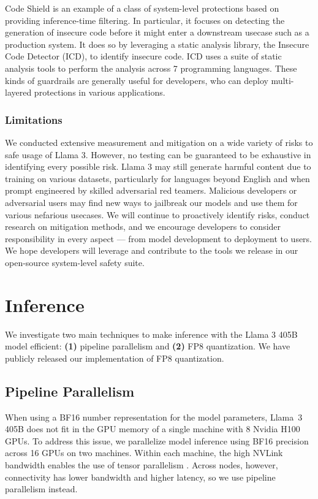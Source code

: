 Code Shield is an example of a class of system-level protections based on providing inference-time filtering. In particular, it focuses on detecting the generation of insecure code before it might enter a downstream usecase such as a production system. It does so by leveraging a static analysis library, the Insecure Code Detector (ICD), to identify insecure code. ICD uses a suite of static analysis tools to perform the analysis across 7 programming languages. These kinds of guardrails are generally useful for developers, who can deploy multi-layered protections in various applications.

\subsubsection{Limitations}

We conducted extensive measurement and mitigation on a wide variety of risks to safe usage of Llama 3. However, no testing can be guaranteed to be exhaustive in identifying every possible risk. Llama 3 may still generate harmful content due to training on various datasets, particularly for languages beyond English and when prompt engineered by skilled adversarial red teamers. Malicious developers or adversarial users may find new ways to jailbreak our models and use them for various nefarious usecases. We will continue to proactively identify risks, conduct research on mitigation methods, and we encourage developers to consider responsibility in every aspect --- from model development to deployment to users. We hope developers will leverage and contribute to the tools we release in our open-source system-level safety suite. 

\section{Inference}
\label{section:inference}
We investigate two main techniques to make inference with the Llama 3 405B model efficient: \textbf{(1)} pipeline parallelism and \textbf{(2)} FP8 quantization. We have publicly released our implementation of FP8 quantization.

\subsection{Pipeline Parallelism}
\label{section:pp}

When using a BF16 number representation for the model parameters, Llama~3 405B does not fit in the GPU memory of a single machine with 8 Nvidia H100 GPUs. To address this issue, we parallelize model inference using BF16 precision across 16 GPUs on two machines. Within each machine, the high NVLink bandwidth enables the use of tensor parallelism \citep{shoeybi2019megatron}. Across nodes, however, connectivity has lower bandwidth and higher latency, so we use pipeline parallelism \citep{huang2019gpipe} instead.

